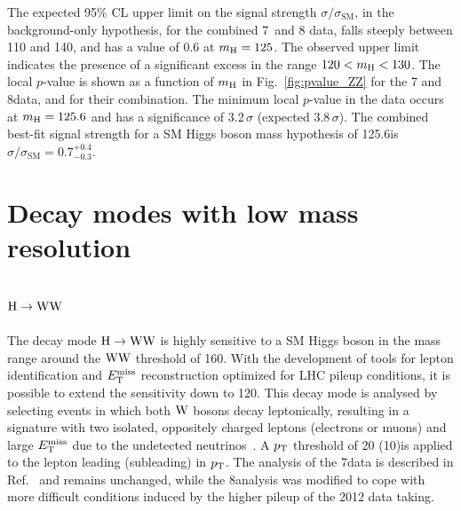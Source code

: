 \documentclass[11pt,twoside,a4paper,cmspaper,final]{cms-tdr}
\begin{document}
The expected 95\% CL upper limit on the signal strength
$\sigma/\sigma_\mathrm{SM}$,
in the background-only hypothesis,
for the combined 7~and 8\TeV
data, falls steeply between 110 and 140\GeV, and has a value
of 0.6 at $m_{\mathrm{H}} = 125$\GeV.
The observed upper limit indicates the presence of a significant excess
in the range $120 < m_{\mathrm{H}} < 130$\GeV. The local $p$-value is shown as a function of $m_{\mathrm{H}}$ in Fig.~\ref{fig:pvalue_ZZ} for the 7 and 8\TeV data, and for their combination.
The minimum local $p$-value in the data occurs at $m_{\mathrm{H}} = 125.6$\GeV
and has a significance of 3.2$\,\sigma$ (expected 3.8$\,\sigma$).
The combined best-fit signal strength for a SM Higgs
boson mass hypothesis of 125.6\GeV is $\sigma/\sigma_\mathrm{SM} = 0.7^{+0.4}_{-0.3}$.
\section{Decay modes with low mass resolution}

\subsection{\texorpdfstring{$\mathrm{H}\to\mathrm{W}\mathrm{W}$}{H to WW}\label{sec:HWW}}

The decay mode $\mathrm{H}\to\mathrm{W}\mathrm{W}$ is highly sensitive to a SM Higgs boson
in the mass range around the $\mathrm{W}\mathrm{W}$ threshold of 160\GeV.
With the development of tools for lepton identification and $E_{\mathrm{T}}^{\text{miss}}$
reconstruction optimized for LHC pileup conditions, it is
possible to extend the sensitivity down to 120\GeV.
This decay mode is analysed by selecting events in which both $\mathrm{W}$ bosons decay leptonically, resulting in a
signature with two isolated, oppositely charged leptons (electrons
or muons) and large $E_{\mathrm{T}}^{\text{miss}}$ due to the undetected neutrinos~\cite{Barger:1990mn,Dittmar:1996ss}.
A $p_{\mathrm{T}}$ threshold of 20 (10)\GeV is applied to
the lepton leading (subleading) in $p_{\mathrm{T}}$.
The analysis of the
7\TeV data is described in Ref.~\cite{Chatrchyan:2012ty} and remains
unchanged, while the 8\TeV analysis was modified to cope with more
difficult conditions induced by the higher pileup of the 2012 data
taking.
\end{document}
